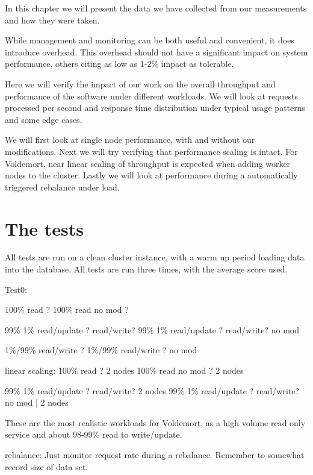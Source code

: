 
In this chapter we will present the data we have collected from our measurements and how they were taken.

While management and monitoring can be both useful and convenient, it does introduce overhead. This overhead should not have a significant impact on system performance, others citing as low as 1-2\% impact as tolerable.

Here we will verify the impact of our work on the overall throughput and performance of the software under different workloads. We will look at requests processed per second and response time distribution under typical usage patterns and some edge cases. 

We will first look at single node performance, with and without our modifications.
Next we will try verifying that performance scaling is intact. For Voldemort, near linear scaling of throughput is expected when adding worker nodes to the cluster.
Lastly we will look at performance during a automatically triggered rebalance under load.

\section{The tests}
All tests are run on a clean cluster instance, with a warm up period loading data into the database. All tests are run three times, with the average score used.

Test0:

100\% read ?
100\% read no mod ?

99\% 1\% read/update ? read/write?
99\% 1\% read/update ? read/write? no mod

1\%/99\% read/write ?
1\%/99\% read/write ? no mod

linear scaling:
100\% read ? 2 nodes
100\% read no mod ? 2 nodes

99\% 1\% read/update ? read/write? 2 nodes
99\% 1\% read/update ? read/write? no mod | 2 nodes

These are the most realistic workloads for Voldemort, as a high volume read only service and about 98-99\% read to write/update.

rebalance:
Just monitor request rate during a rebalance.
Remember to somewhat record size of data set.

